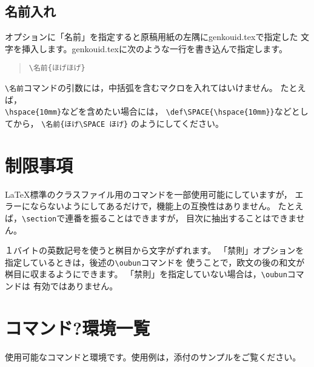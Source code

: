 \documentclass{jarticle}
\begin{document}
\subsection{名前入れ}
オプションに「名前」を指定すると原稿用紙の左隅にgenkouid.texで指定した
文字を挿入します。genkouid.texに次のような一行を書き込んで指定します。

\begin{verse}
\verb+\名前{ほげほげ}+
\end{verse}

\verb+\名前+コマンドの引数には，中括弧を含むマクロを入れてはいけません。
たとえば，\\ \verb+\hspace{10mm}+などを含めたい場合には，
\verb+\def\SPACE{\hspace{10mm}}+などとしてから，
\verb+\名前{ほげ\SPACE ほげ}+
のようにしてください。

\section{制限事項}
\LaTeX{}標準のクラスファイル用のコマンドを一部使用可能にしていますが，
エラーにならないようにしてあるだけで，機能上の互換性はありません。
たとえば，\verb+\section+で連番を振ることはできますが，
目次に抽出することはできません。

１バイトの英数記号を使うと桝目から文字がずれます。
「禁則」オプションを指定しているときは，後述の\verb+\oubun+コマンドを
使うことで，欧文の後の和文が桝目に収まるようにできます。
「禁則」を指定していない場合は，\verb+\oubun+コマンドは
有効ではありません。


\section{コマンド?環境一覧}
使用可能なコマンドと環境です。使用例は，添付のサンプルをご覧ください。
\end{document}
